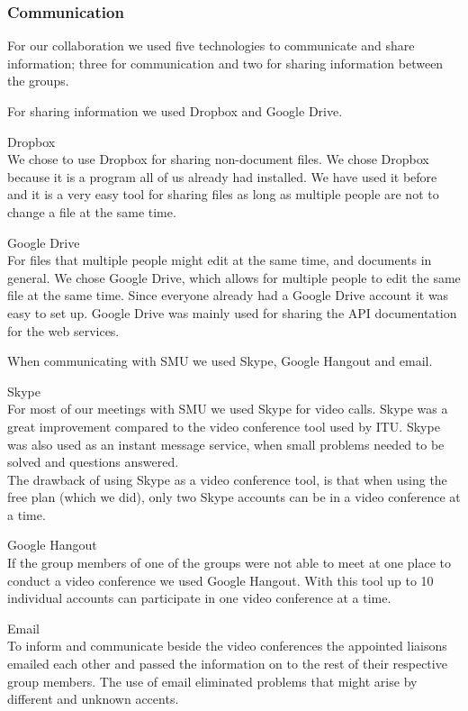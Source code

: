 \subsubsection{Communication}
For our collaboration we used five technologies to communicate and share information; three for communication and two for sharing information between the groups.

For sharing information we used Dropbox and Google Drive. \vspace{-4mm}
\begin{description}
	\item Dropbox \\
		We chose to use Dropbox for sharing non-document files. We chose Dropbox because it is a program all of us already had installed. We have used it before and it is a very easy tool for sharing files as long as multiple people are not to change a file at the same time.
	\item Google Drive \\
		For files that multiple people might edit at the same time, and documents in general. We chose Google Drive, which allows for multiple people to edit the same file at the same time. Since everyone already had a Google Drive account it was easy to set up.
		Google Drive was mainly used for sharing the API documentation for the web services.
\end{description}

When communicating with SMU we used Skype, Google Hangout and email.
\vspace{-4mm}
\begin{description}
	\item Skype \\
		For most of our meetings with SMU we used Skype for video calls. Skype was a great improvement compared to the video conference tool used by ITU.
		Skype was also used as an instant message service, when small problems needed to be solved and questions answered. \\
		The drawback of using Skype as a video conference tool, is that when using the free plan (which we did), only two Skype accounts can be in a video conference at a time.
	\item Google Hangout \\
		If the group members of one of the groups were not able to meet at one place to conduct a video conference we used Google Hangout. With this tool up to 10 individual accounts can participate in one video conference at a time.
	\item Email \\
		To inform and communicate beside the video conferences the appointed liaisons emailed each other and passed the information on to the rest of their respective group members.
		The use of email eliminated problems that might arise by different and unknown accents.
\end{description}